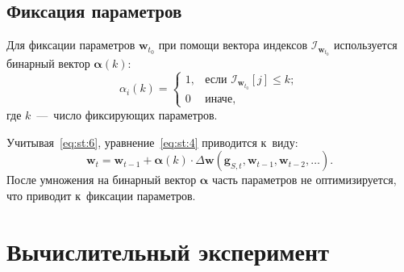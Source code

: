\begin{multicols}{2}
\subsection{Фиксация параметров}

Для фиксации параметров $\mathbf{w}_{t_0}$ при помощи вектора индексов 
$\mathcal{I}_{\mathbf{w}_{t_0}}$ используется бинарный вектор 
$\boldsymbol{\alpha}(k)$:
\begin{equation}
\label{eq:st:6}
\alpha_i(k) = \begin{cases}
 1, &\mbox{если }\mathcal{I}_{\mathbf{w}_{t_0}}[j] \leq k;\\
 0 &\mbox{иначе},
 \end{cases}
\end{equation}
 где $k$~---~число фиксирующих параметров.

 Учитывая~\eqref{eq:st:6}, уравнение~\eqref{eq:st:4} приводится к~виду:
 \begin{equation}
\label{eq:st:7}
\mathbf{w}_{t} = \mathbf{w}_{t-1} + 
\boldsymbol{\alpha}\left(k\right)\cdot\Delta\mathbf{w}\left(\mathbf{g}_{S
,t}, \mathbf{w}_{t-1}, \mathbf{w}_{t-2}, \ldots\right).
\end{equation}
После умножения на 
бинарный вектор $\boldsymbol{\alpha}$ часть параметров не оптимизируется, 
что приводит к~фиксации параметров.

\section{Вычислительный эксперимент}


\end{multicols}
